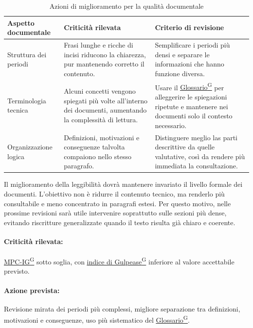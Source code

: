 \documentclass[a4paper,12pt]{article}
\providecommand{\glslink}[2]{\href{https://alittlebyte-19.github.io/Documentazione/glossario.html\#gls-#1}{\underline{#2}\textsuperscript{\scriptsize G}}}
\begin{document}
\begin{table}[H]
    \centering
    \renewcommand{\arraystretch}{1.25}
    \begin{tabularx}{\textwidth}{|p{3.2cm}|X|X|}
        \hline
        \rowcolor{gray!35}
        \textbf{Aspetto documentale} & \textbf{Criticità rilevata} & \textbf{Criterio di revisione} \\
        \hline
        Struttura dei periodi & Frasi lunghe e ricche di incisi riducono la chiarezza, pur mantenendo corretto il contenuto. & Semplificare i periodi più densi e separare le informazioni che hanno funzione diversa. \\
        \hline
        Terminologia tecnica & Alcuni concetti vengono spiegati più volte all'interno dei documenti, aumentando la complessità di lettura. & Usare il \glslink{glossario}{Glossario} per alleggerire le spiegazioni ripetute e mantenere nei documenti solo il contesto necessario. \\
        \hline
        Organizzazione logica & Definizioni, motivazioni e conseguenze talvolta compaiono nello stesso paragrafo. & Distinguere meglio las parti descrittive da quelle valutative, così da rendere più immediata la consultazione. \\
        \hline
    \end{tabularx}
    \caption{Azioni di miglioramento per la qualità documentale}
\end{table}

Il miglioramento della leggibilità dovrà mantenere invariato il livello formale dei documenti. L'obiettivo non è ridurre il contenuto tecnico, ma renderlo più consultabile e meno concentrato in paragrafi estesi. Per questo motivo, nelle prossime revisioni sarà utile intervenire soprattutto sulle sezioni più dense, evitando riscritture generalizzate quando il testo risulta già chiaro e coerente.

\paragraph*{Criticità rilevata:} \glslink{indice-di-gulpease-mpc-ig}{MPC-IG} sotto soglia, con \glslink{indice-di-gulpease-mpc-ig}{indice di Gulpease} inferiore al valore accettabile previsto.

\paragraph*{Azione prevista:} Revisione mirata dei periodi più complessi, migliore separazione tra definizioni, motivazioni e conseguenze, uso più sistematico del \glslink{glossario}{Glossario}.
\end{document}
